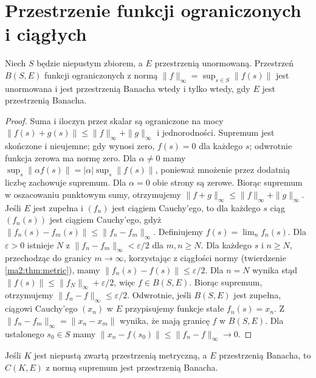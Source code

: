 \section{Przestrzenie funkcji ograniczonych i ciągłych}
\begin{twierdzenie}
\label{ma2:thm:bounded}
Niech $S$ będzie niepustym zbiorem, a $E$ przestrzenią unormowaną.
Przestrzeń $B(S,E)$ funkcji ograniczonych z normą
$\|f\|_\infty=\sup_{s\in S}\|f(s)\|$ jest unormowana
i jest przestrzenią Banacha wtedy i tylko wtedy, gdy $E$ jest
przestrzenią Banacha.
\end{twierdzenie}
\begin{proof}
Suma i iloczyn przez skalar są ograniczone na mocy
$\|f(s)+g(s)\|\le\|f\|_\infty+\|g\|_\infty$ i jednorodności.
Supremum jest skończone i nieujemne; gdy wynosi zero,
$f(s)=0$ dla każdego $s$; odwrotnie funkcja zerowa ma normę zero.
Dla $\alpha\ne0$ mamy
$\sup_s\|\alpha f(s)\|=|\alpha|\sup_s\|f(s)\|$,
ponieważ mnożenie przez dodatnią liczbę zachowuje supremum.
Dla $\alpha=0$ obie strony są zerowe.
Biorąc supremum w oszacowaniu punktowym sumy,
otrzymujemy $\|f+g\|_\infty\le\|f\|_\infty+\|g\|_\infty$.
Jeśli $E$ jest zupełna i $(f_n)$ jest ciągiem Cauchy'ego,
to dla każdego $s$ ciąg $(f_n(s))$ jest ciągiem Cauchy'ego,
gdyż $\|f_n(s)-f_m(s)\|\le\|f_n-f_m\|_\infty$.
Definiujemy $f(s)=\lim_n f_n(s)$.
Dla $\varepsilon>0$ istnieje $N$ z
$\|f_n-f_m\|_\infty<\varepsilon/2$ dla $m,n\ge N$.
Dla każdego $s$ i $n\ge N$, przechodząc do granicy $m\to\infty$,
korzystając z ciągłości normy (twierdzenie \ref{ma2:thm:metric}),
mamy $\|f_n(s)-f(s)\|\le\varepsilon/2$.
Dla $n=N$ wynika stąd $\|f(s)\|\le\|f_N\|_\infty+\varepsilon/2$,
więc $f\in B(S,E)$. Biorąc supremum, otrzymujemy
$\|f_n-f\|_\infty\le\varepsilon/2$.
Odwrotnie, jeśli $B(S,E)$ jest zupełna, ciągowi Cauchy'ego
$(x_n)$ w $E$ przypisujemy funkcje stałe $f_n(s)=x_n$.
Z $\|f_n-f_m\|_\infty=\|x_n-x_m\|$ wynika, że mają granicę
$f$ w $B(S,E)$. Dla ustalonego $s_0\in S$ mamy
$\|x_n-f(s_0)\|\le\|f_n-f\|_\infty\to0$.
\end{proof}
\begin{twierdzenie}
\label{ma2:thm:continuous}
Jeśli $K$ jest niepustą zwartą przestrzenią metryczną,
a $E$ przestrzenią Banacha, to $C(K,E)$ z normą supremum
jest przestrzenią Banacha.
\end{twierdzenie}
